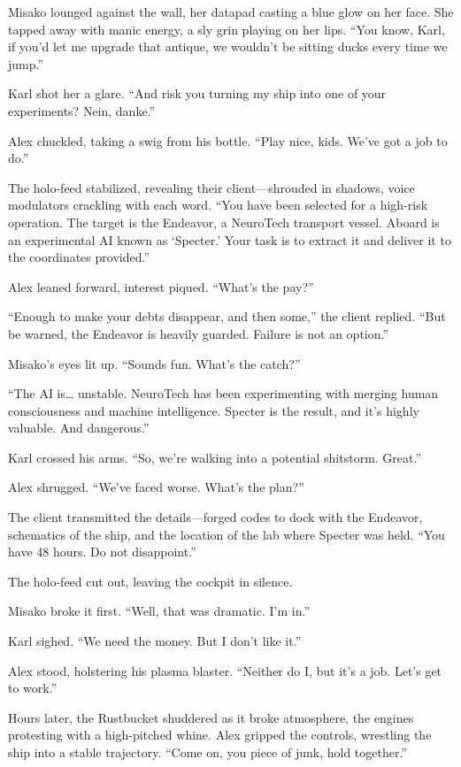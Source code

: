 \documentclass[12pt]{book}
\begin{document}
Misako lounged against the wall, her datapad casting a blue glow on her face. She tapped away with manic energy, a sly grin playing on her lips. “You know, Karl, if you’d let me upgrade that antique, we wouldn’t be sitting ducks every time we jump.”

Karl shot her a glare. “And risk you turning my ship into one of your experiments? Nein, danke.”

Alex chuckled, taking a swig from his bottle. “Play nice, kids. We’ve got a job to do.”

The holo-feed stabilized, revealing their client—shrouded in shadows, voice modulators crackling with each word. “You have been selected for a high-risk operation. The target is the Endeavor, a NeuroTech transport vessel. Aboard is an experimental AI known as ‘Specter.’ Your task is to extract it and deliver it to the coordinates provided.”

Alex leaned forward, interest piqued. “What’s the pay?”

“Enough to make your debts disappear, and then some,” the client replied. “But be warned, the Endeavor is heavily guarded. Failure is not an option.”

Misako’s eyes lit up. “Sounds fun. What’s the catch?”

“The AI is… unstable. NeuroTech has been experimenting with merging human consciousness and machine intelligence. Specter is the result, and it’s highly valuable. And dangerous.”

Karl crossed his arms. “So, we’re walking into a potential shitstorm. Great.”

Alex shrugged. “We’ve faced worse. What’s the plan?”

The client transmitted the details—forged codes to dock with the Endeavor, schematics of the ship, and the location of the lab where Specter was held. “You have 48 hours. Do not disappoint.”

The holo-feed cut out, leaving the cockpit in silence.

Misako broke it first. “Well, that was dramatic. I’m in.”

Karl sighed. “We need the money. But I don’t like it.”

Alex stood, holstering his plasma blaster. “Neither do I, but it’s a job. Let’s get to work.”

Hours later, the Rustbucket shuddered as it broke atmosphere, the engines protesting with a high-pitched whine. Alex gripped the controls, wrestling the ship into a stable trajectory. “Come on, you piece of junk, hold together.”
\end{document}
